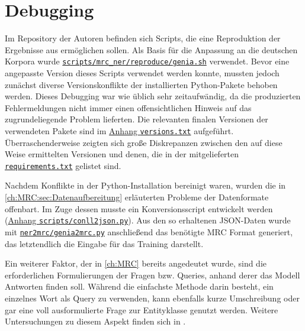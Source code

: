 \section{Debugging}
\label{ch:Training:sec:Debugging}

Im Repository der Autoren befinden sich Scripts, die eine Reproduktion der Ergebnisse aus \textcite{li2019unified} ermöglichen sollen. Als Basis für die Anpassung an die deutschen Korpora wurde \href{https://github.com/ShannonAI/mrc-for-flat-nested-ner/blob/457b0759f7fd462d0abd0a23441726352716fff9/scripts/mrc_ner/reproduce/genia.sh}{\texttt{scripts/mrc\_ner/reproduce/genia.sh}} verwendet. Bevor eine angepasste Version dieses Scripts verwendet werden konnte, mussten jedoch zunächst diverse Versionskonflikte der installierten Python-Pakete behoben werden. Dieses Debugging war wie üblich sehr zeitaufwändig, da die produzierten Fehlermeldungen nicht immer einen offensichtlichen Hinweis auf das zugrundeliegende Problem lieferten. Die relevanten finalen Versionen der verwendeten Pakete sind im \hyperref[app:versions]{Anhang \texttt{versions.txt}} aufgeführt. Überraschenderweise zeigten sich große Diskrepanzen zwischen den auf diese Weise ermittelten Versionen und denen, die in der mitgelieferten \href{https://github.com/ShannonAI/mrc-for-flat-nested-ner/blob/457b0759f7fd462d0abd0a23441726352716fff9/requirements.txt}{\texttt{requirements.txt}} gelistet sind.

Nachdem Konflikte in der Python-Installation bereinigt waren, wurden die in \autoref{ch:MRC:sec:Datenaufbereitung} erläuterten Probleme der Datenformate offenbart. Im Zuge dessen musste ein Konversionsscript entwickelt werden (\hyperref[app:conll2json]{Anhang \texttt{scripts/conll2json.py}}). Aus den so erhaltenen JSON-Daten wurde mit \href{https://github.com/ShannonAI/mrc-for-flat-nested-ner/blob/457b0759f7fd462d0abd0a23441726352716fff9/ner2mrc/genia2mrc.py}{\texttt{ner2mrc/genia2mrc.py}} anschließend das benötigte MRC Format generiert, das letztendlich die Eingabe für das Training darstellt.

Ein weiterer Faktor, der in \autoref{ch:MRC} bereits angedeutet wurde, sind die erforderlichen Formulierungen der Fragen bzw. Queries, anhand derer das Modell Antworten finden soll. Während die einfachste Methode darin besteht, ein einzelnes Wort als Query zu verwenden, kann ebenfalls kurze Umschreibung oder gar eine voll ausformulierte Frage zur Entityklasse genutzt werden. Weitere Untersuchungen zu diesem Aspekt finden sich in \textcite{li2019unified}.

